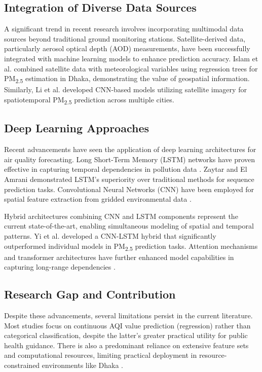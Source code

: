 \documentclass[a4paper,fleqn]{cas-dc}
\begin{document}
\subsection{Integration of Diverse Data Sources}

A significant trend in recent research involves incorporating multimodal data sources beyond traditional ground monitoring stations. Satellite-derived data, particularly aerosol optical depth (AOD) measurements, have been successfully integrated with machine learning models to enhance prediction accuracy. Islam et al. \cite{islam_2022_satellite} combined satellite data with meteorological variables using regression trees for PM\textsubscript{2.5} estimation in Dhaka, demonstrating the value of geospatial information. Similarly, Li et al. \cite{li_2020} developed CNN-based models utilizing satellite imagery for spatiotemporal PM\textsubscript{2.5} prediction across multiple cities.

\subsection{Deep Learning Approaches}

Recent advancements have seen the application of deep learning architectures for air quality forecasting. Long Short-Term Memory (LSTM) networks have proven effective in capturing temporal dependencies in pollution data \cite{hochreiter_1997}. Zaytar and El Amrani \cite{zaytar_2016} demonstrated LSTM's superiority over traditional methods for sequence prediction tasks. Convolutional Neural Networks (CNN) have been employed for spatial feature extraction from gridded environmental data \cite{lecun_1998}.

Hybrid architectures combining CNN and LSTM components represent the current state-of-the-art, enabling simultaneous modeling of spatial and temporal patterns. Yi et al. \cite{yi_2021} developed a CNN-LSTM hybrid that significantly outperformed individual models in PM\textsubscript{2.5} prediction tasks. Attention mechanisms and transformer architectures have further enhanced model capabilities in capturing long-range dependencies \cite{vaswani_2017}.

\subsection{Research Gap and Contribution}

Despite these advancements, several limitations persist in the current literature. Most studies focus on continuous AQI value prediction (regression) rather than categorical classification, despite the latter's greater practical utility for public health guidance. There is also a predominant reliance on extensive feature sets and computational resources, limiting practical deployment in resource-constrained environments like Dhaka \cite{kumar_2022}.
\end{document}
